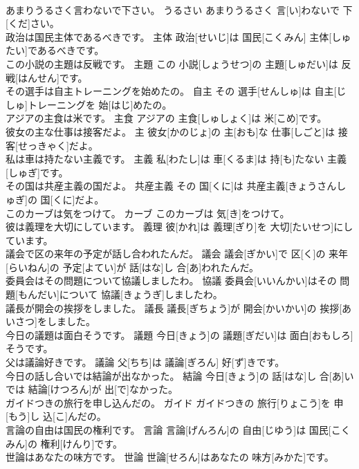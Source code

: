 \documentclass[8pt]{extreport}
\begin{document}
\begin{CJK}{UTF8}{min}
\\	あまりうるさく言わないで下さい。	うるさい	あまりうるさく 言[い]わないで 下[くだ]さい。	
\\	政治は国民主体であるべきです。	主体	政治[せいじ]は 国民[こくみん] 主体[しゅたい]であるべきです。	
\\	この小説の主題は反戦です。	主題	この 小説[しょうせつ]の 主題[しゅだい]は 反戦[はんせん]です。	
\\	その選手は自主トレーニングを始めたの。	自主	その 選手[せんしゅ]は 自主[じしゅ]トレーニングを 始[はじ]めたの。	
\\	アジアの主食は米です。	主食	アジアの 主食[しゅしょく]は 米[こめ]です。	
\\	彼女の主な仕事は接客だよ。	主	彼女[かのじょ]の 主[おも]な 仕事[しごと]は 接客[せっきゃく]だよ。	
\\	私は車は持たない主義です。	主義	私[わたし]は 車[くるま]は 持[も]たない 主義[しゅぎ]です。	
\\	その国は共産主義の国だよ。	共産主義	その 国[くに]は 共産主義[きょうさんしゅぎ]の 国[くに]だよ。	
\\	このカーブは気をつけて。	カーブ	このカーブは 気[き]をつけて。	
\\	彼は義理を大切にしています。	義理	彼[かれ]は 義理[ぎり]を 大切[たいせつ]にしています。	
\\	議会で区の来年の予定が話し合われたんだ。	議会	議会[ぎかい]で 区[く]の 来年[らいねん]の 予定[よてい]が 話[はな]し 合[あ]われたんだ。	
\\	委員会はその問題について協議しましたわ。	協議	委員会[いいんかい]はその 問題[もんだい]について 協議[きょうぎ]しましたわ。	
\\	議長が開会の挨拶をしました。	議長	議長[ぎちょう]が 開会[かいかい]の 挨拶[あいさつ]をしました。	
\\	今日の議題は面白そうです。	議題	今日[きょう]の 議題[ぎだい]は 面白[おもしろ]そうです。	
\\	父は議論好きです。	議論	父[ちち]は 議論[ぎろん] 好[ず]きです。	
\\	今日の話し合いでは結論が出なかった。	結論	今日[きょう]の 話[はな]し 合[あ]いでは 結論[けつろん]が 出[で]なかった。	
\\	ガイドつきの旅行を申し込んだの。	ガイド	ガイドつきの 旅行[りょこう]を 申[もう]し 込[こ]んだの。	
\\	言論の自由は国民の権利です。	言論	言論[げんろん]の 自由[じゆう]は 国民[こくみん]の 権利[けんり]です。	
\\	世論はあなたの味方です。	世論	世論[せろん]はあなたの 味方[みかた]です。	

\end{CJK}
\end{document}
